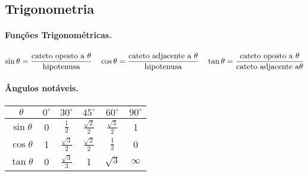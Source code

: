 \subsection{Trigonometria}
\paragraph{Funções Trigonométricas.}
	$$\sin\theta = \frac{\textnormal{cateto oposto a }\theta}{\textnormal{hipotenusa}}  \quad \cos\theta = \frac{\textnormal{cateto adjacente a }\theta}{\textnormal{hipotenusa}} \quad \tan\theta = \frac{\textnormal{cateto oposto a }\theta}{\textnormal{cateto adjacente a}\theta}$$

\paragraph{Ângulos notáveis.}

\begin{center}
	\begin{tabular}{|c|c c c c c|}
		$\theta$ & $0^{\circ}$ & $30^{\circ}$&$45^{\circ}$&$60^{\circ}$&$90^{\circ}$ \\
		\hline
		\rule{0pt}{0.5cm}$\sin\theta$ &0&$\frac{1}{2}$&$\frac{\sqrt{2}}{2}$&$\frac{\sqrt{3}}{2}$&1 \\
		\hline
		\rule{0pt}{0.5cm}$\cos\theta$ &1&$\frac{\sqrt{3}}{2}$&$\frac{\sqrt{2}}{2}$&$\frac{1}{2}$&0 \\
		\hline
		\rule{0pt}{0.5cm}$\tan\theta$ &0&$\frac{\sqrt{3}}{3}$&1&$\sqrt{3}$&$\infty$ \\
		
	\end{tabular}
\end{center}

